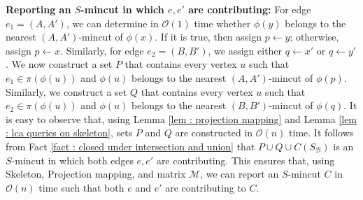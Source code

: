 \documentclass[letterpaper,11pt]{article}
\begin{document}
\noindent
\textbf{Reporting an $S$-mincut in which $e,e'$ are contributing:}
For edge $e_1=(A,A')$, we can determine in ${\mathcal O}(1)$ time whether $\phi(y)$ belongs to the nearest $(A,A')$-mincut of $\phi(x)$. If it is true, then assign $p\gets y$; otherwise, assign $p\gets x$. Similarly, for edge $e_2=(B,B')$, we assign either $q\gets x'$ or $q\gets y'$. We now construct a set $P$ that contains every vertex $u$ such that $e_1\in \pi(\phi(u))$ and $\phi(u)$ belongs to the nearest $(A,A')$-mincut of $\phi(p)$. Similarly, we construct a set $Q$ that contains every vertex $u$ such that $e_2\in \pi(\phi(u))$ and $\phi(u)$ belongs to the nearest $(B,B')$-mincut of $\phi(q)$. It is easy to observe that, using Lemma \ref{lem : projection mapping} and Lemma \ref{lem : lca queries on skeleton}, sets $P$ and $Q$ are constructed in ${\mathcal O}(n)$ time. It follows from Fact \ref{fact : closed under intersection and union} that $P\cup Q\cup C(S_{\mathcal B})$ is an $S$-mincut in which both edges $e,e'$ are contributing. This ensures that, using Skeleton, Projection mapping, and matrix ${\mathcal M}$, we can report an $S$-mincut $C$ in ${\mathcal O}(n)$ time such that both $e$ and $e'$ are contributing to $C$.\\
\end{document}
